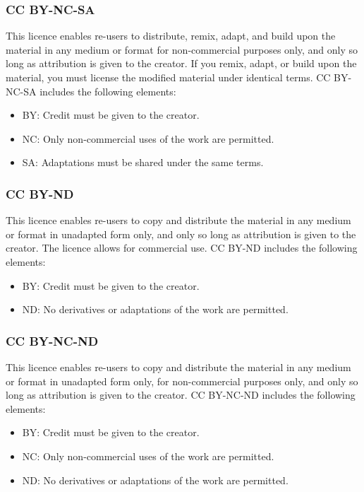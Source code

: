 \documentclass[11pt]{article}
\begin{document}
\subsubsection{CC BY-NC-SA}
\label{sec:org76207f4}
This licence enables re-users to distribute, remix, adapt, and build upon the material in any medium or format for non-commercial purposes only, and only so long as attribution is given to the creator. If you remix, adapt, or build upon the material, you must license the modified material under identical terms. CC BY-NC-SA includes the following elements:
\begin{itemize}
\item BY: Credit must be given to the creator.
\item NC: Only non-commercial uses of the work are permitted.
\item SA: Adaptations must be shared under the same terms.
\end{itemize}

\subsubsection{CC BY-ND}
\label{sec:org48458d0}
This licence enables re-users to copy and distribute the material in any medium or format in unadapted form only, and only so long as attribution is given to the creator. The licence allows for commercial use. CC BY-ND includes the following elements:
\begin{itemize}
\item BY: Credit must be given to the creator.
\item ND: No derivatives or adaptations of the work are permitted.
\end{itemize}

 \newpage

\subsubsection{CC BY-NC-ND}
\label{sec:orgee5c464}
This licence enables re-users to copy and distribute the material in any medium or format in unadapted form only, for non-commercial purposes only, and only so long as attribution is given to the creator. CC BY-NC-ND includes the following elements:
\begin{itemize}
\item BY: Credit must be given to the creator.
\item NC: Only non-commercial uses of the work are permitted.
\item ND: No derivatives or adaptations of the work are permitted.
\end{itemize}
\end{document}
